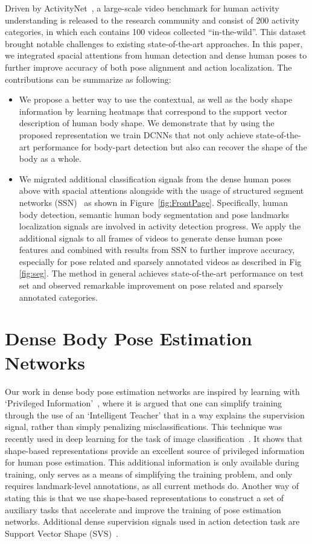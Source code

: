 Driven by ActivityNet~\cite{caba2015activitynet}, a large-scale video benchmark for human activity understanding is released to the research community and consist of 200 activity categories, in which each contains 100 videos collected ``in-the-wild''. This dataset brought notable challenges to existing state-of-the-art approaches. In this paper, we integrated spacial attentions from human detection and dense human poses to further improve accuracy of both pose alignment and action localization. The contributions can be summarize as following: 
\begin{itemize}
\item  We propose a better way to use the contextual, as well as the body shape information by learning heatmaps that correspond to the support vector description of human body shape. We demonstrate that by using the proposed representation we train DCNNs that not only achieve state-of-the-art performance for body-part detection but also can recover the shape of the body as a whole.

\item  We migrated additional classification signals from the dense human poses above with spacial attentions alongside with the usage of structured segment networks (SSN)~\cite{zhao2017temporal} as shown in Figure~\ref{fig:FrontPage}. Specifically, human body detection, semantic human body segmentation and pose landmarks localization signals are involved in activity detection progress. We apply the additional signals to all frames of videos to generate dense human pose features and combined with results from SSN to further improve accuracy, especially for pose related and sparsely annotated videos as described in Fig \ref{fig:seg}. The method in general achieves state-of-the-art performance on test set and observed remarkable improvement on pose related and sparsely annotated categories. 

\end{itemize}

\section{Dense Body Pose Estimation Networks}
Our work in dense body pose estimation networks are inspired by learning with `Privileged Information'~\cite{VapnikV09,david16,ChenJFY17,zhou2016estimating}, where it is argued that one can simplify training through the use of an `Intelligent Teacher' that in a way explains the supervision signal, rather than simply penalizing misclassifications. This technique was recently used in deep learning for the task of image classification~\cite{ChenJFY17}. It shows that shape-based representations provide an excellent source of privileged information for human pose estimation. This additional information is only available during training, only serves as a means of simplifying the training problem, and only requires landmark-level annotations, as all current methods do. Another way of stating this is that we use shape-based representations to construct a set of auxiliary tasks that accelerate and improve the training of pose estimation networks. Additional dense supervision signals used in action detection task are Support Vector Shape (SVS)~\cite{van2013support}.

